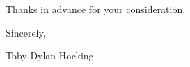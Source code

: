 \documentclass{article}
\begin{document}




Thanks in advance for your consideration.

Sincerely,


Toby Dylan Hocking
\end{document}
